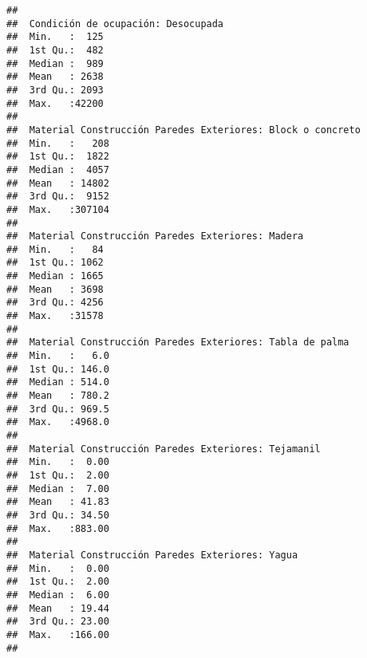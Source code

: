 \documentclass[11pt,]{article}
\begin{document}
\begin{verbatim}
##                                                        
##  Condición de ocupación: Desocupada
##  Min.   :  125                     
##  1st Qu.:  482                     
##  Median :  989                     
##  Mean   : 2638                     
##  3rd Qu.: 2093                     
##  Max.   :42200                     
##                                    
##  Material Construcción Paredes Exteriores: Block o concreto
##  Min.   :   208                                            
##  1st Qu.:  1822                                            
##  Median :  4057                                            
##  Mean   : 14802                                            
##  3rd Qu.:  9152                                            
##  Max.   :307104                                            
##                                                            
##  Material Construcción Paredes Exteriores: Madera
##  Min.   :   84                                   
##  1st Qu.: 1062                                   
##  Median : 1665                                   
##  Mean   : 3698                                   
##  3rd Qu.: 4256                                   
##  Max.   :31578                                   
##                                                  
##  Material Construcción Paredes Exteriores: Tabla de palma
##  Min.   :   6.0                                          
##  1st Qu.: 146.0                                          
##  Median : 514.0                                          
##  Mean   : 780.2                                          
##  3rd Qu.: 969.5                                          
##  Max.   :4968.0                                          
##                                                          
##  Material Construcción Paredes Exteriores: Tejamanil
##  Min.   :  0.00                                     
##  1st Qu.:  2.00                                     
##  Median :  7.00                                     
##  Mean   : 41.83                                     
##  3rd Qu.: 34.50                                     
##  Max.   :883.00                                     
##                                                     
##  Material Construcción Paredes Exteriores: Yagua
##  Min.   :  0.00                                 
##  1st Qu.:  2.00                                 
##  Median :  6.00                                 
##  Mean   : 19.44                                 
##  3rd Qu.: 23.00                                 
##  Max.   :166.00                                 
##                                                 

\end{verbatim}
\end{document}
